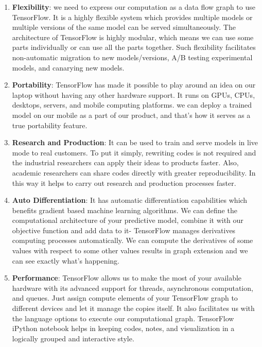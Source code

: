 \documentclass[11pt]{article}
\begin{document}
\begin{enumerate}
\def\labelenumi{\arabic{enumi}.}
\item
  \textbf{Flexibility}: we need to express our computation as a data
  flow graph to use TensorFlow. It is a highly flexible system which
  provides multiple models or multiple versions of the same model can be
  served simultaneously. The architecture of TensorFlow is highly
  modular, which means we can use some parts individually or can use all
  the parts together. Such flexibility facilitates non-automatic
  migration to new models/versions, A/B testing experimental models, and
  canarying new models.
\item
  \textbf{Portability}: TensorFlow has made it possible to play around
  an idea on our laptop without having any other hardware support. It
  runs on GPUs, CPUs, desktops, servers, and mobile computing platforms.
  we can deploy a trained model on our mobile as a part of our product,
  and that's how it serves as a true portability feature.
\item
  \textbf{Research and Production}: It can be used to train and serve
  models in live mode to real customers. To put it simply, rewriting
  codes is not required and the industrial researchers can apply their
  ideas to products faster. Also, academic researchers can share codes
  directly with greater reproducibility. In this way it helps to carry
  out research and production processes faster.
\item
  \textbf{Auto Differentiation}: It has automatic differentiation
  capabilities which benefits gradient based machine learning
  algorithms. We can define the computational architecture of your
  predictive model, combine it with our objective function and add data
  to it- TensorFlow manages derivatives computing processes
  automatically. We can compute the derivatives of some values with
  respect to some other values results in graph extension and we can see
  exactly what's happening.
\item
  \textbf{Performance}: TensorFlow allows us to make the most of your
  available hardware with its advanced support for threads, asynchronous
  computation, and queues. Just assign compute elements of your
  TensorFlow graph to different devices and let it manage the copies
  itself. It also facilitates us with the language options to execute
  our computational graph. TensorFlow iPython notebook helps in keeping
  codes, notes, and visualization in a logically grouped and interactive
  style.
\end{enumerate}
\end{document}
